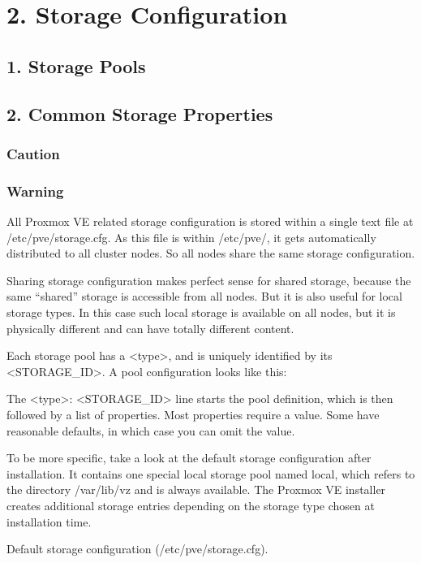 \section{2. Storage Configuration}

\subsection{1. Storage Pools}

\subsection{2. Common Storage Properties}

\subsubsection{Caution}

\subsubsection{Warning}

All Proxmox VE related storage configuration is stored within a single text file at /etc/pve/storage.cfg. As this file is within /etc/pve/, it gets automatically distributed to all cluster nodes. So all nodes share the same storage configuration.

Sharing storage configuration makes perfect sense for shared storage, because the same “shared” storage is accessible from all nodes. But it is also useful for local storage types. In this case such local storage is available on all nodes, but it is physically different and can have totally different content.

Each storage pool has a <type>, and is uniquely identified by its <STORAGE_ID>. A pool configuration looks like this:

The <type>: <STORAGE_ID> line starts the pool definition, which is then followed by a list of properties. Most properties require a value. Some have reasonable defaults, in which case you can omit the value.

To be more specific, take a look at the default storage configuration after installation. It contains one special local storage pool named local, which refers to the directory /var/lib/vz and is always available. The Proxmox VE installer creates additional storage entries depending on the storage type chosen at installation time.

Default storage configuration (/etc/pve/storage.cfg).

